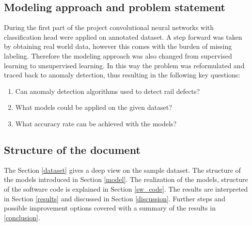 \subsection{Modeling approach and problem statement}
During the first part of the project convolutional neural networks with classification head were applied
on annotated dataset.
A step forward was taken by obtaining real world data, however this comes with the burden of
missing labeling.
Therefore the modeling approach was also changed from supervised learning to unsupervised learning.
In this way the problem was reformulated and traced back to anomaly detection, thus resulting in the
following key questions:

\begin{enumerate}[label=Q\arabic*]
    \item \label{itm:Q1} Can anomaly detection algorithms used to detect rail defects?
    \item \label{itm:Q2} What models could be applied on the given dataset?
    \item \label{itm:Q3} What accuracy rate can be achieved with the models?
\end{enumerate}

\subsection{Structure of the document}
The Section \ref{dataset} gives a deep view on the sample dataset.
The structure of the models introduced in Section \ref{model}.
The realization of the models, structure of the software code is explained in Section \ref{sw_code}.
The results are interpreted in Section \ref{results} and discussed in Section \ref{discussion}.
Further steps and possible improvement options covered with a summary of the results in \ref{conclusion}.
